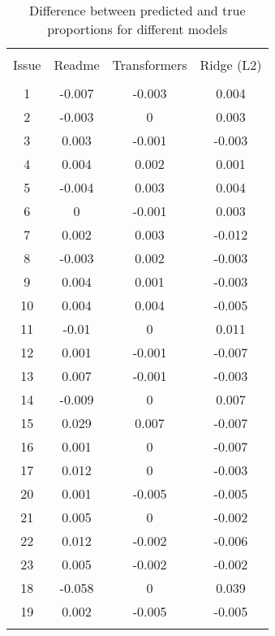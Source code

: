 
\begin{table}[!htbp] \centering 
  \caption{Difference between predicted and true proportions for different models} 
  \label{tab:aggregated-eval} 
\begin{tabular}{@{\extracolsep{5pt}} cccc} 
\\[-1.8ex]\hline 
\hline \\[-1.8ex] 
Issue & Readme & Transformers & Ridge (L2) \\ 
\hline \\[-1.8ex] 
1 & -0.007 & -0.003 & 0.004 \\ 
2 & -0.003 & 0 & 0.003 \\ 
3 & 0.003 & -0.001 & -0.003 \\ 
4 & 0.004 & 0.002 & 0.001 \\ 
5 & -0.004 & 0.003 & 0.004 \\ 
6 & 0 & -0.001 & 0.003 \\ 
7 & 0.002 & 0.003 & -0.012 \\ 
8 & -0.003 & 0.002 & -0.003 \\ 
9 & 0.004 & 0.001 & -0.003 \\ 
10 & 0.004 & 0.004 & -0.005 \\ 
11 & -0.01 & 0 & 0.011 \\ 
12 & 0.001 & -0.001 & -0.007 \\ 
13 & 0.007 & -0.001 & -0.003 \\ 
14 & -0.009 & 0 & 0.007 \\ 
15 & 0.029 & 0.007 & -0.007 \\ 
16 & 0.001 & 0 & -0.007 \\ 
17 & 0.012 & 0 & -0.003 \\ 
20 & 0.001 & -0.005 & -0.005 \\ 
21 & 0.005 & 0 & -0.002 \\ 
22 & 0.012 & -0.002 & -0.006 \\ 
23 & 0.005 & -0.002 & -0.002 \\ 
18 & -0.058 & 0 & 0.039 \\ 
19 & 0.002 & -0.005 & -0.005 \\ 
\hline \\[-1.8ex] 
\end{tabular} 
\end{table} 
